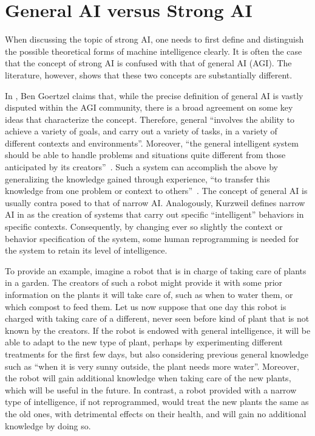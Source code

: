 \section{General AI versus Strong AI}

When discussing the topic of strong AI, one needs to first define and distinguish the possible theoretical forms of machine intelligence clearly. It is often the case that the concept of strong AI is confused with that of general AI (AGI). The literature, however, shows that these two concepts are substantially different.

In \cite{goertzel2014artificial}, Ben Goertzel claims that, while the precise definition of general AI is vastly disputed within the AGI community, there is a broad agreement on some key ideas that characterize the concept. Therefore, general ``involves the ability to achieve a variety of goals, and carry out a variety of tasks, in a variety of different contexts and environments''. Moreover, ``the general intelligent system should be able to handle problems and situations quite different from those anticipated by its creators''~\cite[p.~2]{goertzel2014artificial}. Such a system can accomplish the above by generalizing the knowledge gained through experience, ``to transfer this knowledge from one problem or context to others''~\cite[p.~3]{goertzel2014artificial}. The concept of general AI is usually contra posed to that of narrow AI. Analogously, Kurzweil defines narrow AI in \cite{kurzweil2005singularity} as the creation of systems that carry out specific ``intelligent'' behaviors in specific contexts. Consequently, by changing ever so slightly the context or behavior specification of the system, some human reprogramming is needed for the system to retain its level of intelligence.

To provide an example, imagine a robot that is in charge of taking care of plants in a garden. The creators of such a robot might provide it with some prior information on the plants it will take care of, such as when to water them, or which compost to feed them. Let us now suppose that one day this robot is charged with taking care of a different, never seen before kind of plant that is not known by the creators. If the robot is endowed with general intelligence, it will be able to adapt to the new type of plant, perhaps by experimenting different treatments for the first few days, but also considering previous general knowledge such as ``when it is very sunny outside, the plant needs more water''. Moreover, the robot will gain additional knowledge when taking care of the new plants, which will be useful in the future. In contrast, a robot provided with a narrow type of intelligence, if not reprogrammed, would treat the new plants the same as the old ones, with detrimental effects on their health, and will gain no additional knowledge by doing so.

